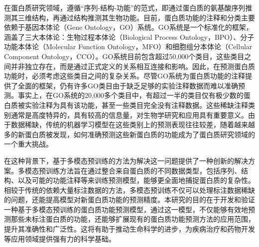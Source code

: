 在蛋白质研究领域，遵循“序列-结构-功能”的范式，即通过蛋白质的氨基酸序列推测其三维结构，再通过结构推测其生物功能。目前，蛋白质功能的注释和分类主要依赖于基因本体论（Gene Ontology，GO）系统。GO系统是一个标准化的框架，涵盖了三大本体论：生物过程本体论（Biological Process Ontology，BPO）、分子功能本体论（Molecular Function Ontology，MFO）和细胞组分本体论（Cellular Component Ontology，CCO）。GO系统目前包含超过50,000个类目，这些类目之间并非独立存在，而是通过正式定义的关系相互连接和影响。因此，在预测蛋白质功能时，必须考虑这些类目之间的复杂关系。尽管GO系统为蛋白质功能的注释提供了全面的框架，仍有许多GO类目由于缺乏足够的实验注释数据而难以准确预测。事实上，在GO系统的20,000多个类目中，有超过一半的类目仅有极少数的蛋白质被实验注释为具有该功能，甚至一些类目完全没有注释数据。这些稀缺注释类别通常是高度特异的，具有较高的信息量，对生物学研究和应用具有重要意义。由于数据稀缺，传统的机器学习模型在这些类别上的预测表现往往较差，随着越来越多的新蛋白质被发现，如何准确预测这些新蛋白质的功能成为了蛋白质研究领域的一个重大挑战。

在这种背景下，基于多模态预训练的方法为解决这一问题提供了一种创新的解决方案\cite{wang2023large}。多模态预训练方法旨在通过整合来自蛋白质的不同数据类型，包括序列、结构、以及可能的功能注释等来训练预测模型，能够更全面地捕捉蛋白质的复杂性。相较于传统的依赖大量标注数据的方法，多模态预训练不仅可以处理标注数据稀缺的问题，还能提高模型对新蛋白质功能的预测精度。本研究的目的在于开发和验证一种基于多模态预训练的蛋白质功能预测模型，通过这一模型，不仅能够有效地预测那些未标注蛋白质的功能，还能够扩展现有的蛋白质功能预测方法的应用范围，提升其准确性和广泛性。这将有助于推动生命科学的进步，为疾病治疗和药物开发等应用领域提供强有力的科学基础。